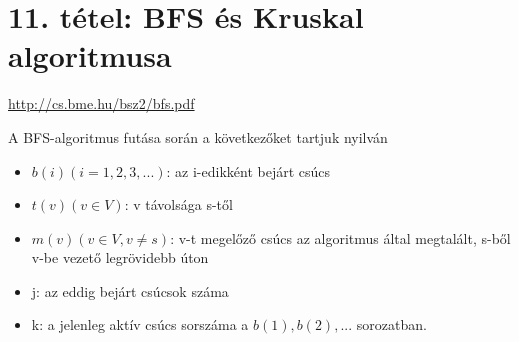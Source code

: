 \section{11. tétel: BFS és Kruskal algoritmusa}

\url{http://cs.bme.hu/bsz2/bfs.pdf}

\begin{tetel}{A BFS-algoritmus futása során a következőket tartjuk nyilván}
\begin{itemize}
\item $b(i) (i = 1,2,3,...)$: az i-edikként bejárt csúcs
\item $t(v) (v \in V)$: v távolsága s-től
\item $m(v) (v \in V, v \neq s)$: v-t megelőző csúcs az algoritmus által megtalált, s-ből v-be vezető legrövidebb úton
\item j: az eddig bejárt csúcsok száma
\item k: a jelenleg aktív csúcs sorszáma a $b(1), b(2),...$ sorozatban.
\end{itemize}
\end{tetel}

